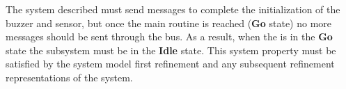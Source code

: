 The system described must send messages to complete the initialization of the buzzer and sensor, but once the main routine is reached (\textbf{Go} state) no more messages should be sent through the \SPI bus. As a result, when the \ASIC is in the \textbf{Go} state the \SPI subsystem must be in the \textbf{Idle} state. This system property must be satisfied by the system model first refinement and any subsequent refinement representations of the system.




